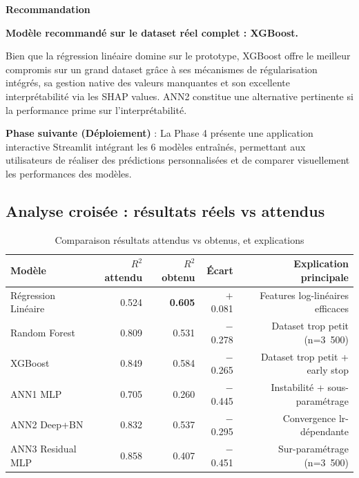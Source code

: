 \documentclass[12pt,a4paper]{article}
\begin{document}
\textbf{Recommandation}

\begin{tcolorbox}[colback=accentcolor!5,colframe=accentcolor,width=\textwidth,arc=2mm,boxrule=1pt]
\textbf{Modèle recommandé sur le dataset réel complet : XGBoost.}

Bien que la régression linéaire domine sur le prototype, XGBoost offre le meilleur
compromis sur un grand dataset grâce à ses mécanismes de régularisation intégrés,
sa gestion native des valeurs manquantes et son excellente interprétabilité via les
SHAP values. ANN2 constitue une alternative pertinente si la performance prime sur
l'interprétabilité.

\bigskip
\textbf{Phase suivante (Déploiement)} : La Phase 4 présente une application interactive
Streamlit intégrant les 6 modèles entraînés, permettant aux utilisateurs de réaliser des
prédictions personnalisées et de comparer visuellement les performances des modèles.
\end{tcolorbox}


\subsection{Analyse croisée : résultats réels vs attendus}

\begin{table}[H]
\centering
\begin{tabular}{@{}lrrrr@{}}
\toprule
\textbf{Modèle} & \textbf{$R^2$ attendu} & \textbf{$R^2$ obtenu} &
\textbf{Écart} & \textbf{Explication principale} \\ \midrule
Régression Linéaire & 0.524 & \textbf{0.605} & $+$0.081 & Features log-linéaires efficaces \\
Random Forest       & 0.809 & 0.531          & $-$0.278 & Dataset trop petit (n=3~500)     \\
XGBoost             & 0.849 & 0.584          & $-$0.265 & Dataset trop petit + early stop  \\
ANN1 MLP            & 0.705 & 0.260          & $-$0.445 & Instabilité + sous-paramétrage   \\
ANN2 Deep+BN        & 0.832 & 0.537          & $-$0.295 & Convergence lr-dépendante        \\
ANN3 Residual MLP   & 0.858 & 0.407          & $-$0.451 & Sur-paramétrage (n=3~500)        \\ \bottomrule
\end{tabular}
\caption{Comparaison résultats attendus vs obtenus, et explications}
\end{table}
\end{document}
